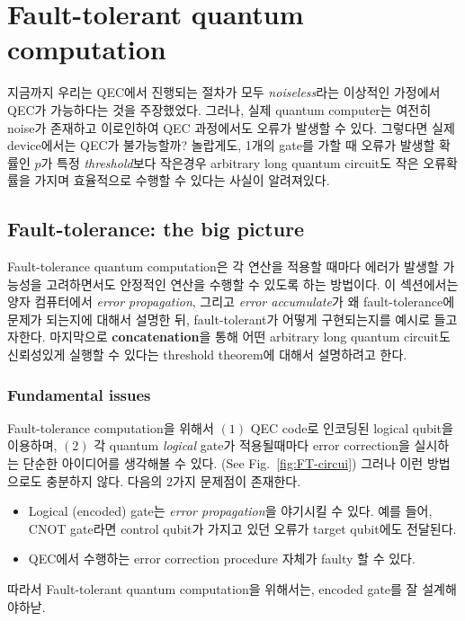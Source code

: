\section{Fault-tolerant quantum computation}
지금까지 우리는 QEC에서 진행되는 절차가 모두 \textit{noiseless}라는 이상적인 가정에서 QEC가 가능하다는 것을 주장했었다. 그러나, 실제 quantum computer는 여전히 noise가 존재하고 이로인하여 QEC 과정에서도 오류가 발생할 수 있다. 
그렇다면 실제 device에서는 QEC가 불가능할까? 놀랍게도, 1개의 gate를 가할 때 오류가 발생할 확률인 $p$가 특정 \textit{threshold}보다 작은경우 arbitrary long quantum circuit도 작은 오류확률을 가지며 효율적으로 수행할 수 있다는 사실이 알려져있다. 

\subsection{Fault-tolerance: the big picture}

Fault-tolerance quantum computation은 각 연산을 적용할 때마다 에러가 발생할 가능성을 고려하면서도 안정적인 연산을 수행할 수 있도록 하는 방법이다. 
이 섹션에서는 양자 컴퓨터에서 \textit{error propagation}, 그리고 \textit{error accumulate}가 왜 fault-tolerance에 문제가 되는지에 대해서 설명한 뒤, 
fault-tolerant가 어떻게 구현되는지를 예시로 들고자한다. 마지막으로 \textbf{concatenation}을 통해 어떤 arbitrary long quantum circuit도 신뢰성있게 실행할 수 있다는 threshold theorem에 대해서 설명하려고 한다.

\subsubsection{Fundamental issues}
Fault-tolerance computation을 위해서 $(1)$ QEC code로 인코딩된 logical qubit을 이용하며, $(2)$ 각 quantum \textit{logical} gate가 적용될때마다 error correction을 실시하는 단순한 아이디어를 생각해볼 수 있다. (See Fig.~\ref{fig:FT-circui}) 그러나 이런 방법으로도 충분하지 않다. 다음의 2가지 문제점이 존재한다.
\begin{itemize}
    \item Logical (encoded) gate는 \textit{error propagation}을 야기시킬 수 있다. 예를 들어, CNOT gate라면 control qubit가 가지고 있던 오류가 target qubit에도 전달된다.
    \item QEC에서 수행하는 error correction procedure 자체가 faulty 할 수 있다.
\end{itemize}
따라서 Fault-tolerant quantum computation을 위해서는, encoded gate를 잘 설계해야하낟. 

